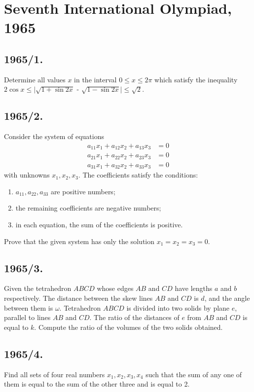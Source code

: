 \documentclass{article}
\begin{document}
\section{Seventh International Olympiad, 1965}

\subsection*{1965/1.}
Determine all values $x$ in the interval $0 \leq x \leq 2\pi$ which satisfy the inequality ${2 \cos x \leq \vert \sqrt {1 + \sin{2x}}}$ - $ \sqrt{1 - \sin{2x}} \vert \leq \sqrt{2}$.

\subsection*{1965/2.}
Consider the system of equations
\[
\begin{align}
a_{11}x_1 + a_{12}x_2 + a_{13}x_3 & = 0 \\
a_{21}x_1 + a_{22}x_2 + a_{23}x_3 & = 0 \\
a_{31}x_1 + a_{32}x_2 + a_{33}x_3 & = 0
\end{align}
\]
with unknowns $x_1, x_2, x_3$. The coefficients satisfy the conditions:
\begin{enumerate}
    \item $a_{11}, a_{22}, a_{33}$ are positive numbers;
    \item the remaining coefficients are negative numbers;
    \item in each equation, the sum of the coefficients is positive.
\end{enumerate}
Prove that the given system has only the solution $x_1 = x_2 = x_3 = 0$.

\subsection*{1965/3.}
Given the tetrahedron $ABCD$ whose edges $AB$ and $CD$ have lengths $a$ and $b$ respectively. The distance between the skew lines $AB$ and $CD$ is $d$, and the angle between them is $\omega$. Tetrahedron $ABCD$ is divided into two solids by plane $e$, parallel to lines $AB$ and $CD$. The ratio of the distances of $e$ from $AB$ and $CD$ is equal to $k$. Compute the ratio of the volumes of the two solids obtained.

\subsection*{1965/4.}
Find all sets of four real numbers $x_1, x_2, x_3, x_4$ such that the sum of any one of them is equal to the sum of the other three and is equal to 2.
\end{document}
